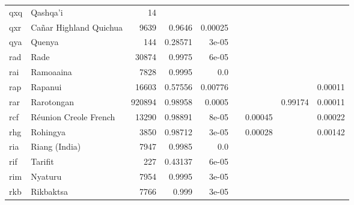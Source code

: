 \documentclass[11pt]{article}
\begin{document}
\begin{table*}[h]
{\begin{tabular}{llrrrrrrr}
qxq         & Qashqa'i         & 14         &          &          &          &          &          &          \\

qxr         & Cañar Highland Quichua         & 9639         & 0.9646         & 0.00025         &          &          &          &          \\

qya         & Quenya         & 144         & 0.28571         & 3e-05         &          &          &          &          \\

rad         & Rade         & 30874         & 0.9975         & 6e-05         &          &          &          &          \\

rai         & Ramoaaina         & 7828         & 0.9995         & 0.0         &          &          &          &          \\

rap         & Rapanui         & 16603         & 0.57556         & 0.00776         &          &          &          & 0.00011         \\

rar         & Rarotongan         & 920894         & 0.98958         & 0.0005         &          &          & 0.99174         & 0.00011         \\

rcf         & Réunion Creole French         & 13290         & 0.98891         & 8e-05         &          & 0.00045         &          & 0.00022         \\

rhg         & Rohingya         & 3850         & 0.98712         & 3e-05         &          & 0.00028         &          & 0.00142         \\

ria         & Riang (India)         & 7947         & 0.9985         & 0.0         &          &          &          &          \\

rif         & Tarifit         & 227         & 0.43137         & 6e-05         &          &          &          &          \\

rim         & Nyaturu         & 7954         & 0.9995         & 3e-05         &          &          &          &          \\

rkb         & Rikbaktsa         & 7766         & 0.999         & 3e-05         &          &          &          &          \\


\end{tabular}}
\end{table*}
\end{document}
